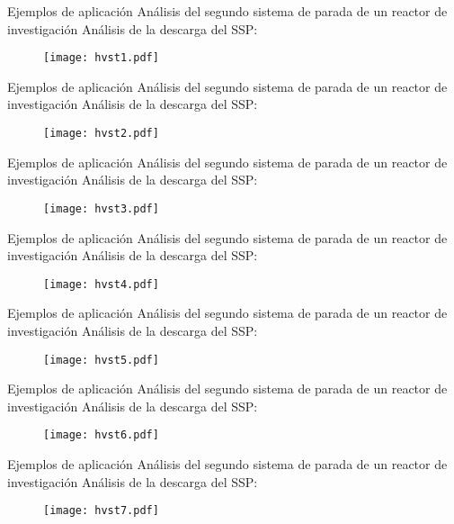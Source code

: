 \begin{frame}
{Ejemplos de aplicación}
{Análisis del segundo sistema de parada de un reactor de investigación}
Análisis de la descarga del SSP:
\begin{figure}
\centering{}
\texttt{[image: hvst1.pdf]}
\end{figure}
\end{frame}
\begin{frame}
{Ejemplos de aplicación}
{Análisis del segundo sistema de parada de un reactor de investigación}
Análisis de la descarga del SSP:
\begin{figure}
\centering{}
\texttt{[image: hvst2.pdf]}
\end{figure}
\end{frame}
\begin{frame}
{Ejemplos de aplicación}
{Análisis del segundo sistema de parada de un reactor de investigación}
Análisis de la descarga del SSP:
\begin{figure}
\centering{}
\texttt{[image: hvst3.pdf]}
\end{figure}
\end{frame}
\begin{frame}
{Ejemplos de aplicación}
{Análisis del segundo sistema de parada de un reactor de investigación}
Análisis de la descarga del SSP:
\begin{figure}
\centering{}
\texttt{[image: hvst4.pdf]}
\end{figure}
\end{frame}
\begin{frame}
{Ejemplos de aplicación}
{Análisis del segundo sistema de parada de un reactor de investigación}
Análisis de la descarga del SSP:
\begin{figure}
\centering{}
\texttt{[image: hvst5.pdf]}
\end{figure}
\end{frame}
\begin{frame}
{Ejemplos de aplicación}
{Análisis del segundo sistema de parada de un reactor de investigación}
Análisis de la descarga del SSP:
\begin{figure}
\centering{}
\texttt{[image: hvst6.pdf]}
\end{figure}
\end{frame}
\begin{frame}
{Ejemplos de aplicación}
{Análisis del segundo sistema de parada de un reactor de investigación}
Análisis de la descarga del SSP:
\begin{figure}
\centering{}
\texttt{[image: hvst7.pdf]}
\end{figure}
\end{frame}

